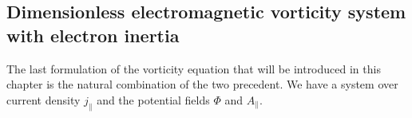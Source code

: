 \subsection{Dimensionless electromagnetic vorticity system with electron inertia}
The last formulation of the vorticity equation that will be introduced in this chapter is the natural combination of the two precedent. We have a system over current density  $j_\parallel$ and the potential fields $\Phi$ and $A_\parallel$. 
%
%
